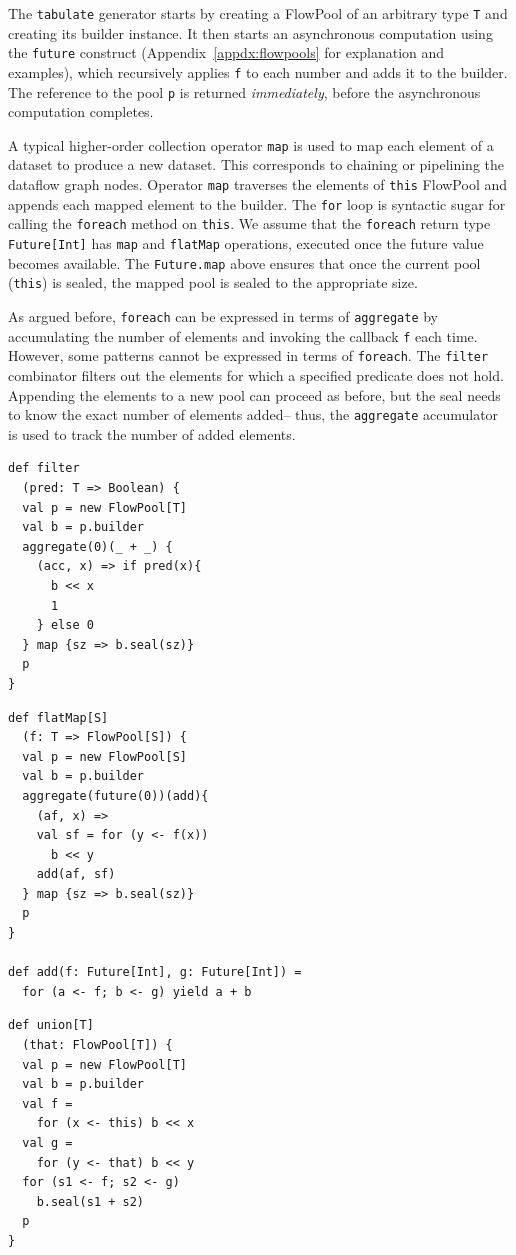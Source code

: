 The \verb=tabulate= generator starts by creating a FlowPool of an
arbitrary type \verb=T= and creating its builder instance.
It then starts an asynchronous computation using the \verb=future=
construct (Appendix~\ref{appdx:flowpools}
for explanation and examples), which recursively applies \verb=f= to each number and
adds it to the builder.
The reference to the pool \verb=p= is returned \emph{immediately},
before the asynchronous computation completes.

A typical higher-order collection operator \verb=map= is used to
map each element of a dataset to produce a new dataset.
This corresponds to chaining or pipelining the dataflow graph nodes.
Operator \verb=map= traverses the elements of \verb=this= FlowPool
and appends each mapped element to the builder.
The \verb=for= loop is syntactic sugar for calling the
\verb=foreach= method on \verb=this=.
We assume that the \verb=foreach= return type \verb=Future[Int]=
has \verb=map= and \verb=flatMap= operations, executed
once the future value becomes available.
The \verb=Future.map= above ensures that once the current pool (\verb=this=) is
sealed, the mapped pool is sealed to the appropriate size.

As argued before, \verb=foreach= can be expressed in terms of
\verb=aggregate= by accumulating the number of elements and invoking the
callback \verb=f= each time.
However, some patterns cannot be expressed in terms of \verb=foreach=.
The \verb=filter= combinator filters out the elements for which a
specified predicate does not hold.
Appending the elements to a new pool can proceed as
before, but the seal needs to know the exact number of elements added--
thus, the \verb=aggregate= accumulator is used to track the number
of added elements.

\noindent
\begin{minipage}[t]{5.2 cm}
\begin{verbatim}
def filter
  (pred: T => Boolean) {
  val p = new FlowPool[T]
  val b = p.builder
  aggregate(0)(_ + _) {
    (acc, x) => if pred(x){
      b << x
      1
    } else 0
  } map {sz => b.seal(sz)}
  p
}
\end{verbatim}
\end{minipage}\begin{minipage}[t]{5.3 cm}
\begin{verbatim}
def flatMap[S]
  (f: T => FlowPool[S]) {
  val p = new FlowPool[S]
  val b = p.builder
  aggregate(future(0))(add){
    (af, x) =>
    val sf = for (y <- f(x))
      b << y
    add(af, sf)
  } map {sz => b.seal(sz)}
  p
}

def add(f: Future[Int], g: Future[Int]) =
  for (a <- f; b <- g) yield a + b
\end{verbatim}
\end{minipage}
\begin{minipage}[t]{4 cm}
\begin{verbatim}
def union[T]
  (that: FlowPool[T]) {
  val p = new FlowPool[T]
  val b = p.builder
  val f =
    for (x <- this) b << x
  val g =
    for (y <- that) b << y
  for (s1 <- f; s2 <- g)
    b.seal(s1 + s2)
  p
}
\end{verbatim}
\end{minipage}

